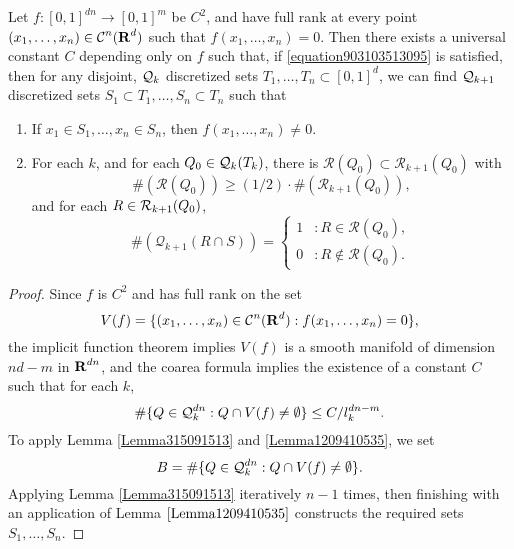 \begin{corollary} \label{PramanikFraserBuildingBlockLemma}
    Let $f: [0,1]^{dn} \to [0,1]^m$ be $C^2$, and have full rank at every point $(x_1, \dots, x_n) \in \operatorname{\mathcal{C}}^n(\operatorname{\mathbf{R}}^d)$ such that $f(x_1, \dots, x_n) = 0$. Then there exists a universal constant $C$ depending only on $f$ such that, if \eqref{equation903103513095} is satisfied, then for any disjoint, $\operatorname{\mathcal{Q}}_k$ discretized sets $T_1, \dots, T_n \subset [0,1]^d$, we can find $\operatorname{\mathcal{Q}}_{k+1}$ discretized sets $S_1 \subset T_1, \dots, S_n \subset T_n$ such that
    \begin{enumerate}
        \item If $x_1 \in S_1, \dots, x_n \in S_n$, then $f(x_1, \dots, x_n) \neq 0$.
        \item For each $k$, and for each $Q_0 \in \operatorname{\mathcal{Q}}_k(T_k)$, there is $\mathcal{R}(Q_0) \subset \mathcal{R}_{k+1}(Q_0)$ with
        \[ \#(\mathcal{R}(Q_0)) \geq (1/2) \cdot \#(\mathcal{R}_{k+1}(Q_0)), \]
        and for each $R \in \operatorname{\mathcal{R}}_{k+1}(Q_0)$,
        \[ \#(\mathcal{Q}_{k+1}(R \cap S)) = \begin{cases} 1 &: R \in \mathcal{R}(Q_0), \\ 0 &: R \not \in \mathcal{R}(Q_0). \end{cases} \]
    \end{enumerate}
\end{corollary}
\begin{proof}
    Since $f$ is $C^2$ and has full rank on the set
    \[ V(f) = \{ (x_1, \dots, x_n) \in \operatorname{\mathcal{C}}^n(\operatorname{\mathbf{R}}^d) : f(x_1, \dots, x_n) = 0 \}, \]
    the implicit function theorem implies $V(f)$ is a smooth manifold of dimension $nd - m$ in $\operatorname{\mathbf{R}}^{dn}$, and the coarea formula implies the existence of a constant $C$ such that for each $k$,
    \[ \# \{ Q \in \operatorname{\mathcal{Q}}_k^{dn} : Q \cap V(f) \neq \emptyset \} \leq C/l_k^{dn-m}. \]
    To apply Lemma \ref{Lemma315091513} and \ref{Lemma1209410535}, we set
    \[ B = \# \{ Q \in \operatorname{\mathcal{Q}}_k^{dn} : Q \cap V(f) \neq \emptyset \}. \]
    Applying Lemma \ref{Lemma315091513} iteratively $n-1$ times, then finishing with an application of Lemma $\ref{Lemma1209410535}$ constructs the required sets $S_1, \dots, S_n$.
\end{proof}

